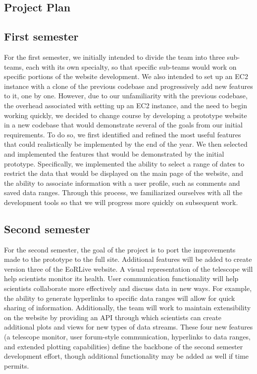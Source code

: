 \documentclass[12pt]{article}
\begin{document}
\begin{spacing}{1.5}
\section{Project Plan}
\subsection{First semester}
For the first semester, we initially intended to divide the team into three sub-teams, each with its own specialty, so that specific sub-teams would work on specific portions of the website development. We also intended to set up an EC2 instance with a clone of the previous codebase and progressively add new features to it, one by one. However, due to our unfamiliarity with the previous codebase, the overhead associated with setting up an EC2 instance, and the need to begin working quickly, we decided to change course by developing a prototype website in a new codebase that would demonstrate several of the goals from our initial requirements. To do so, we first identified and refined the most useful features that could realistically be implemented by the end of the year. We then selected and implemented the features that would be demonstrated by the initial prototype. Specifically, we implemented the ability to select a range of dates to restrict the data that would be displayed on the main page of the website, and the ability to associate information with a user profile, such as comments and saved data ranges. Through this process, we familiarized ourselves with all the development tools so that we will progress more quickly on subsequent work.
\subsection{Second semester}
For the second semester, the goal of the project is to port the improvements made to the prototype to the full site. Additional features will be added to create version three of the EoRLive website. A visual representation of the telescope will help scientists monitor its health. User communication functionality will help scientists collaborate more effectively and discuss data in new ways. For example, the ability to generate hyperlinks to specific data ranges will allow for quick sharing of information. Additionally, the team will work to maintain extensibility on the website by providing an API through which scientists can create additional plots and views for new types of data streams. These four new features (a telescope monitor, user forum-style communication, hyperlinks to data ranges, and extended plotting capabilities) define the backbone of the second semester development effort, though additional functionality may be added as well if time permits.


\end{spacing}
\end{document}
